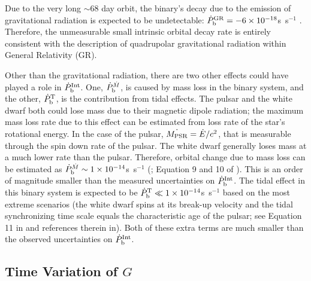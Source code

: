Due to the very long $\sim$68 day orbit, the binary's decay due to the
emission of gravitational
radiation is expected to be undetectable: $\dot{P}_{\rm b}^{\rm GR} =
-6\times10^{-18}$s~s$^{-1}$ \citep{lk05}.  Therefore, the unmeasurable small 
intrinsic orbital decay rate is entirely consistent with the
description of quadrupolar gravitational radiation within General
Relativity (GR).

Other than the gravitational radiation, there are two other effects could have played a role in
$\dot{P}_{\rm b}^{\rm Int}$. One, $\dot{P}_{\rm b}^{\dot{M}}$, is caused by mass loss in the
binary system, and the other, $\dot{P}_{\rm b}^{\rm T}$, is the contribution
from tidal effects.
The pulsar and the white dwarf both could lose mass due to their magnetic dipole radiation; the maximum
mass loss rate due to this effect can be estimated from loss rate of the
star's rotational energy. In the case of the pulsar, $\dot{M_{\rm
PSR}}=\dot{E}/c^2$, that is
measurable through the spin down rate of the pulsar.
The white dwarf generally loses mass at a much lower rate than the pulsar.
Therefore, orbital change due to mass loss can be estimated as $\dot{P}_{\rm
b}^{\dot{M}}\sim 1\times10^{-14}$s~s$^{-1}$ (\citealt{dt91}; Equation 9 and 10
of \citealt{fwe+12}). This is an order of magnitude smaller than the measured
uncertainties on $\dot{P}_{\rm b}^{\rm Int}$.
The tidal effect in this binary system is expected to be $\dot{P}_{\rm b}^{\rm
T}\ll1\times10^{-14}$s~s$^{-1}$ based on the most extreme scenarios (the white
dwarf spins at its break-up velocity and the tidal synchronizing time scale equals the
characteristic age of the pulsar; see Equation 11 in \citealt{fwe+12} and
references therein in).
Both of these extra terms are much smaller than the observed uncertainties
on $\dot{P}_{\rm b}^{\rm Int}$.


\subsection{Time Variation of $G$}
\label{sec:Gdot}


